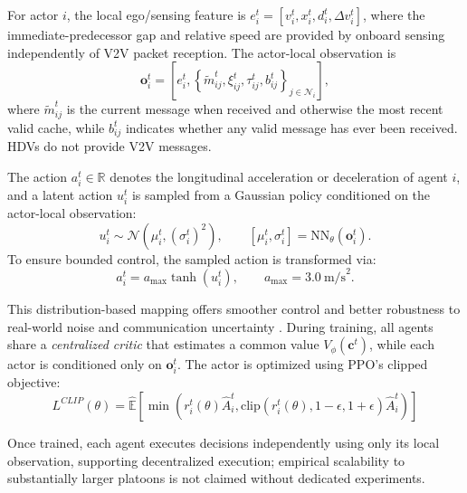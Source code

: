 \documentclass{ieeeaccess}
\begin{document}
For actor $i$, the local ego/sensing feature is $e_i^t=[v_i^t,x_i^t,d_i^t,\Delta v_i^t]$, where the immediate-predecessor gap and relative speed are provided by onboard sensing independently of V2V packet reception. The actor-local observation is
\begin{equation}
\mathbf{o}_{i}^{t}
=
\left[
e_i^t,
\left\{\tilde m_{ij}^{t},\xi_{ij}^{t},\tau_{ij}^{t},b_{ij}^{t}\right\}_{j\in\mathcal N_i}
\right],
\end{equation}
where $\tilde m_{ij}^{t}$ is the current message when received and otherwise the most recent valid cache, while $b_{ij}^{t}$ indicates whether any valid message has ever been received. HDVs do not provide V2V messages. %

The action $a_{i}^{t} \in \mathbb{R}$ denotes the longitudinal acceleration or deceleration of agent $i$, and a latent action $u_i^t$ is sampled from a Gaussian policy conditioned on the actor-local observation:
\begin{equation}
u_{i}^{t}\sim\mathcal{N}\!\left(\mu_i^t,(\sigma_i^t)^2\right),
\qquad
[\mu_i^t,\sigma_i^t]=\text{NN}_{\theta}(\mathbf{o}_i^t).
\end{equation}
To ensure bounded control, the sampled action is transformed via:
\begin{equation}
a_{i}^{t}=a_{\max}\tanh(u_i^t),\qquad a_{\max}=3.0~\text{m/s}^2.
\end{equation} %

This distribution-based mapping offers smoother control and better robustness to real-world noise and communication uncertainty \cite{qu2023picgan}. During training, all agents share a \textit{centralized critic} that estimates a common value $V_{\phi}(\mathbf{c}^{t})$, while each actor is conditioned only on $\mathbf{o}_{i}^{t}$. The actor is optimized using PPO’s clipped objective:
\begin{equation}
L^{CLIP}(\theta) = \hat{\mathbb{E}} \left[ \min(r_{i}^{t}(\theta)\hat{A}_{i}^{t}, \text{clip}(r_{i}^{t}(\theta), 1-\epsilon, 1+\epsilon)\hat{A}_{i}^{t}) \right]
\end{equation}

Once trained, each agent executes decisions independently using only its local observation, supporting decentralized execution; empirical scalability to substantially larger platoons is not claimed without dedicated experiments.
\end{document}

